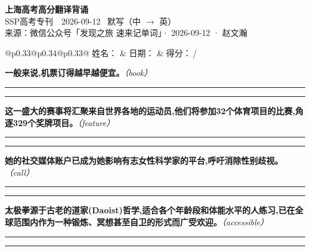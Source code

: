 \documentclass[11pt,a4paper]{article}
\newcommand{\num}[1]{\makebox[1.9em][r]{#1.}\hspace{0.3em}}
\newcommand{\wline}{\noindent\rule{\linewidth}{0.4pt}}
\newcommand{\prompt}[1]{\emph{\textcolor{tipblue}{\small（#1）}}}
\begin{document}
\pagestyle{plain}
\begin{center}
{\LARGE\bfseries 上海高考高分翻译背诵 }\\[0.25em]
{\large SSP高考专刊　2026-09-12 \quad\ 默写（中 $\to$ 英）}\\[0.35em]
{\footnotesize 来源：微信公众号「发现之旅 速来记单词」· 2026-09-12 · 赵文瀚}
\end{center}

\vspace{0.4em}
\noindent\begin{tabular}{@{}p{0.33\textwidth}@{}p{0.34\textwidth}@{}p{0.33\textwidth}@{}}
姓名：\underline{\hspace{2.0cm}} & 日期：\underline{\hspace{2.0cm}} & 得分：\underline{\hspace{1.4cm}}\,/ \\
\end{tabular}

\vspace{0.5em}

\vspace{0.8em}
\num{1}\textbf{一般来说,机票订得越早越便宜。}\prompt{book}

\vspace{0.3em}

\wline\vspace{0.3em}
\wline

\num{2}\textbf{这一盛大的赛事将汇聚来自世界各地的运动员,他们将参加32个体育项目的比赛,角逐329个奖牌项目。}\prompt{feature}

\vspace{0.3em}

\wline\vspace{0.3em}
\wline

\num{3}\textbf{她的社交媒体账户已成为她影响有志女性科学家的平台,呼吁消除性别歧视。}\prompt{call}

\vspace{0.3em}

\wline\vspace{0.3em}
\wline

\num{4}\textbf{太极拳源于古老的道家(Daoist)哲学,适合各个年龄段和体能水平的人练习,已在全球范围内作为一种锻炼、冥想甚至自卫的形式而广受欢迎。}\prompt{accessible}

\vspace{0.3em}

\wline\vspace{0.3em}
\wline
\end{document}
